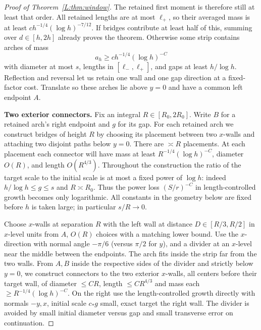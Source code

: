 \begin{proof}[Proof of Theorem~\ref{L:thm:window}]
The retained first moment is therefore still at least that order.
All retained lengths are at most $\ell_+$, so their averaged mass is
at least $ch^{-1/4}(\log h)^{-7/12}$.  If bridges contribute at least
half of this, summing over $d\in[h,2h]$ already proves the theorem.
Otherwise some strip contains arches of mass
\[
 a_h\ge c h^{-1/4}(\log h)^{-C}
\]
with diameter at most $s$, lengths in $[\ell_-,\ell_+]$, and gaps
at least $h/\log h$.  Reflection and reversal let us retain one
wall and one gap direction at a fixed-factor cost.  Translate so
these arches lie above $y=0$ and have a common left endpoint $A$.

\medskip\noindent\textbf{Two exterior connectors.}
Fix an integral $R\in[R_0,2R_0]$.  Write $B$ for a retained arch's
right endpoint and $g$ for its gap.  For each retained arch we construct
bridges of height $R$ by choosing its placement between two $x$-walls
and attaching two disjoint paths below $y=0$.  There are $\asymp R$
placements.  At each placement each connector will have mass at least
$R^{-1/4}(\log h)^{-C}$, diameter $O(R)$, and length $O(R^{4/3})$.
Throughout the construction the ratio of the target scale to the
initial scale is at most a fixed power of $\log h$: indeed
$h/\log h\le g\le s$ and $R\asymp R_0$.  Thus the power loss
$(S/r)^{-C}$ in length-controlled growth becomes only logarithmic.
All constants in the geometry below are fixed before $h$ is taken
large; in particular $s/R\to0$.

Choose \(x\)-walls at separation \(R\) with the left wall at distance \(D\in[R/3,R/2]\) in \(x\)-level units from \(A\), \(O(R)\) choices with a matching lower bound. Use the \(x\)-direction with normal angle \(-\pi/6\) (versus \(\pi/2\) for \(y\)), and a divider at an \(x\)-level near the middle between the endpoints. The arch fits inside the strip far from the two walls. From \(A,B\) inside the respective sides of the divider and strictly below \(y=0\), we construct connectors to the two exterior \(x\)-walls, all centers before their target wall, of diameter \(\le C R\), length \(\le C R^{4/3}\) and mass each \(\ge R^{-1/4}(\log h)^{-C}\). On the right use the length-controlled growth directly with normals \(-y,x\), initial scale \(c_* g\) small, exact target the right wall. The divider is avoided by small initial diameter versus gap and small transverse error on continuation.


\end{proof}
